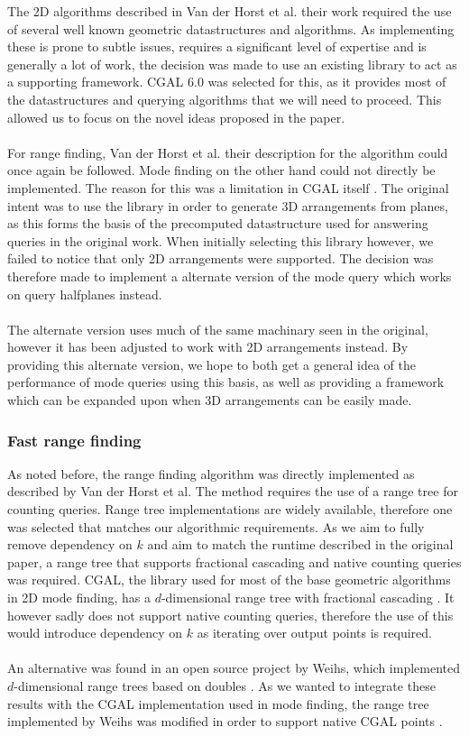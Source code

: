 \documentclass{article}
\begin{document}
The 2D algorithms described in Van der Horst et al. their work required the use
of several well known geometric datastructures and algorithms. As implementing
these is prone to subtle issues, requires a significant level of expertise and
is generally a lot of work, the decision was made to use an existing library to
act as a supporting framework. CGAL 6.0 \cite{cgal:foundations} was selected
for this, as it provides most of the datastructures and querying algorithms
that we will need to proceed. This allowed us to focus on the novel ideas
proposed in the paper. \\\\ For range finding, Van der Horst et al. their
description for the algorithm could once again be followed. Mode finding on the
other hand could not directly be implemented. The reason for this was a
limitation in CGAL itself \cite{cgal:arrangement}. The original intent was to
use the library in order to generate 3D arrangements from planes, as this forms
the basis of the precomputed datastructure used for answering queries in the
original work. When initially selecting this library however, we failed to
notice that only 2D arrangements were supported. The decision was therefore
made to implement a alternate version of the mode query which works on query
halfplanes instead. \\\\ The alternate version uses much of the same machinary
seen in the original, however it has been adjusted to work with 2D arrangements
instead. By providing this alternate version, we hope to both get a general
idea of the performance of mode queries using this basis, as well as providing
a framework which can be expanded upon when 3D arrangements can be easily made.
\subsubsection{Fast range finding}
As noted before, the range finding algorithm was directly implemented as
described by Van der Horst et al. The method requires the use of a range tree
for counting queries. Range tree implementations are widely available,
therefore one was selected that matches our algorithmic requirements. As we aim
to fully remove dependency on $k$ and aim to match the runtime described in the
original paper, a range tree that supports fractional cascading and native
counting queries was required. CGAL, the library used for most of the base
geometric algorithms in 2D mode finding, has a $d$-dimensional range tree with
fractional cascading \cite{cgal:rangetree}. It however sadly does not support
native counting queries, therefore the use of this would introduce dependency
on $k$ as iterating over output points is required. \\\\ An alternative was
found in an open source project by Weihs, which implemented $d$-dimensional
range trees based on doubles \cite{Lucaweihs}. As we wanted to integrate these
results with the CGAL implementation used in mode finding, the range tree
implemented by Weihs was modified in order to support native CGAL points
\cite{cgal:numbertypes} \cite{cgal:foundations} \cite{cgal:dDkernel}.
\end{document}
